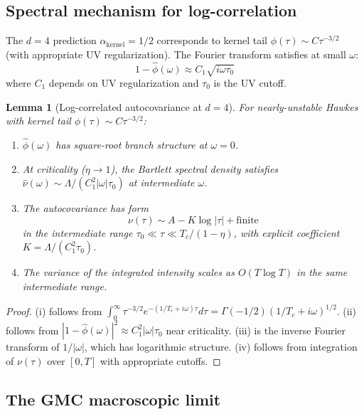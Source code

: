 \documentclass[11pt,a4paper]{article}
\newtheorem{lemma}[theorem]{Lemma}
\begin{document}
\subsection{Spectral mechanism for log-correlation}

The $d = 4$ prediction $\alpha_{\mathrm{kernel}} = 1/2$ corresponds to kernel tail $\phi(\tau) \sim C\tau^{-3/2}$ (with appropriate UV regularization). The Fourier transform satisfies at small $\omega$:
\begin{equation}
1 - \hat\phi(\omega) \approx C_1\sqrt{i\omega \tau_0}
\end{equation}
where $C_1$ depends on UV regularization and $\tau_0$ is the UV cutoff.

\begin{lemma}[Log-correlated autocovariance at $d=4$]
\label{lem:log-cor}
For nearly-unstable Hawkes with kernel tail $\phi(\tau) \sim C\tau^{-3/2}$:
\begin{enumerate}
\item[(i)] $\hat\phi(\omega)$ has square-root branch structure at $\omega = 0$.
\item[(ii)] At criticality ($\eta \to 1$), the Bartlett spectral density satisfies $\hat\nu(\omega) \sim \Lambda/(C_1^2|\omega|\tau_0)$ at intermediate $\omega$.
\item[(iii)] The autocovariance has form
\begin{equation}
\nu(\tau) \sim A - K\log|\tau| + \text{finite}
\end{equation}
in the intermediate range $\tau_0 \ll \tau \ll T_c/(1-\eta)$, with explicit coefficient $K = \Lambda/(C_1^2\tau_0)$.
\item[(iv)] The variance of the integrated intensity scales as $O(T \log T)$ in the same intermediate range.
\end{enumerate}
\end{lemma}

\begin{proof}
(i) follows from $\int_0^\infty \tau^{-3/2} e^{-(1/T_c + i\omega)\tau}d\tau = \Gamma(-1/2)(1/T_c + i\omega)^{1/2}$. (ii) follows from $|1-\hat\phi(\omega)|^2 \approx C_1^2|\omega|\tau_0$ near criticality. (iii) is the inverse Fourier transform of $1/|\omega|$, which has logarithmic structure. (iv) follows from integration of $\nu(\tau)$ over $[0, T]$ with appropriate cutoffs.
\end{proof}

\subsection{The GMC macroscopic limit}
\end{document}

